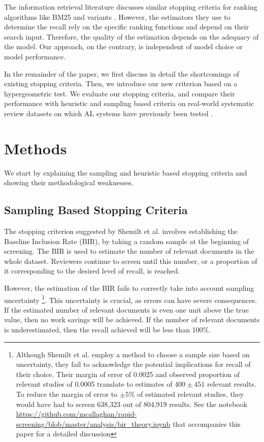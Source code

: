\documentclass{bmcart}
\begin{document}
	The information retrieval literature discusses similar stopping criteria for ranking algorithms like BM25 and variants \cite{DiNunzio2018, Yu2019}. However, the estimators they use to determine the recall rely on the specific ranking functions and depend on their search input. Therefore, the quality of the estimation depends on the adequacy of the model. Our approach, on the contrary, is independent of model choice or model performance. 
	
	In the remainder of the paper, we first discuss in detail the shortcomings of existing stopping criteria. Then, we introduce our new criterion based on a hypergeometric test. We evaluate our stopping criteria, and compare their performance with heuristic and sampling based criteria on real-world systematic review datasets on which AL systems have previously been tested \cite{Cohen2006, Yu2019, Terasawa2009, Castaldi2009}.
	
	\section*{Methods}

	
	
	We start by explaining the sampling and heuristic based stopping criteria and showing their methodological weaknesses. 
	
	\subsection*{Sampling Based Stopping Criteria}
	
	The stopping criterion suggested by Shemilt et al. \cite{Shemilt2014} involves establishing the Baseline Inclusion Rate (BIR), by taking a random sample at the beginning of screening. 
	The BIR is used to estimate the number of relevant documents in the whole dataset. 
	Reviewers continue to screen until this number, or a proportion of it corresponding to the desired level of recall, is reached.
	
	
	However, the estimation of the BIR fails to correctly take into account sampling uncertainty \footnote{Although Shemilt et al. \cite{Shemilt2014} employ a method  to choose a sample size based on uncertainty, they fail to acknowledge the potential implications for recall of their choice. Their margin of error of 0.0025 and observed proportion of relevant studies of 0.0005 translate to estimates of $400 \pm 451$ relevant results. To reduce the margin of error to $\pm 5\%$ of estimated relevant studies, they would have had to screen 638,323 out of 804,919 results. See the notebook \url{https://github.com/mcallaghan/rapid-screening/blob/master/analysis/bir_theory.ipynb} that accompanies this paper for a detailed discussion}. 
	This uncertainty is crucial, as errors can have severe consequences. If the estimated number of relevant documents is even one unit above the true value, then no work savings will be achieved. If the number of relevant documents is underestimated, then the recall achieved will be less than 100\%.
	
\end{document}
